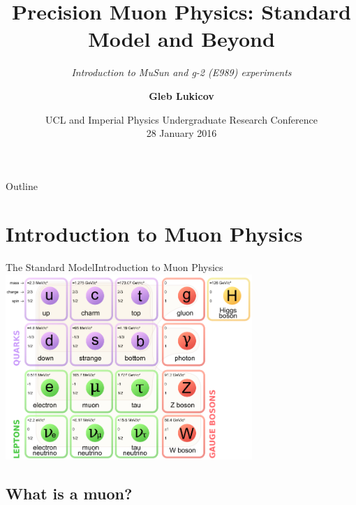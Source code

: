 \documentclass{beamer}
\title[Precision Muon Physics]{Precision Muon Physics: Standard Model and Beyond}
\subtitle{\it{Introduction to MuSun and g-2 (E989) experiments}}
\author{\textbf{Gleb Lukicov}\inst{}}
\institute[] %
{
  \inst{}%
  4th Year Undergraduate MSci Physics Student \\
  Department of Physics and Astronomy\\
  University College London}
\date[28 January 2016]{UCL and Imperial Physics Undergraduate Research Conference \\ 28 January 2016}
\begin{document}
\begin{frame}
  \titlepage
\end{frame}

\begin{frame}{Outline}
  \tableofcontents
\end{frame}


\section{Introduction to Muon Physics}

\begin{frame}{The Standard Model}{Introduction to Muon Physics}
\centering
\includegraphics[width=0.7\textwidth]{figures/SM}
 \let\thefootnote\relax{}
\end{frame}

\subsection*{What is a muon?}
\end{document}
